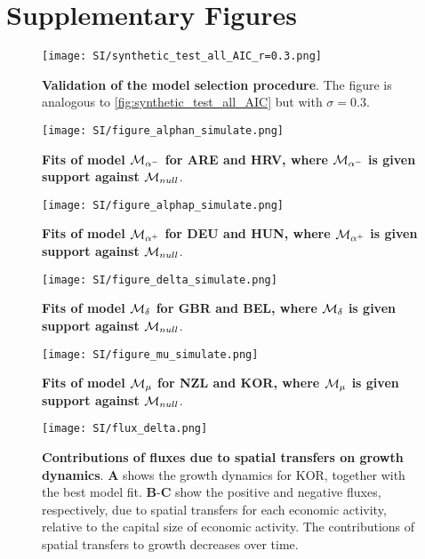 
\graphicspath{{./content/chap4_econobiology/figures/}}

\clearpage
\section{Supplementary Figures}

\begin{figure}[ht]
  \center
  \texttt{[image: SI/synthetic\_test\_all\_AIC\_r=0.3.png]}
  \caption{\small \textbf{Validation of the model selection procedure}. The figure is analogous to \cref{fig:synthetic_test_all_AIC} but with $\sigma = 0.3$. 
   }\label{figSI:synthetic_test_all_AIC}
\end{figure}

\begin{figure}[ht]
  \center
  \texttt{[image: SI/figure\_alphan\_simulate.png]}
  \caption{\small \textbf{Fits of model $\mathcal{M}_{\alpha^-}$ for ARE and HRV, where $\mathcal{M}_{\alpha^-}$ is given support against $\mathcal{M}_{null}$}. 
   }\label{figSI:fit_alphan}
\end{figure}

\begin{figure}[ht]
  \center
  \texttt{[image: SI/figure\_alphap\_simulate.png]}
  \caption{\small \textbf{Fits of model $\mathcal{M}_{\alpha^+}$ for DEU and HUN, where $\mathcal{M}_{\alpha^+}$ is given support against $\mathcal{M}_{null}$}. 
   }\label{figSI:fit_alphap}
\end{figure}

\begin{figure}[ht]
  \center
  \texttt{[image: SI/figure\_delta\_simulate.png]}
  \caption{\small \textbf{Fits of model $\mathcal{M}_\delta$ for GBR and BEL, where $\mathcal{M}_\delta$ is given support against $\mathcal{M}_{null}$}. 
   }\label{figSI:fit_delta}
\end{figure}

\begin{figure}[ht]
  \center
  \texttt{[image: SI/figure\_mu\_simulate.png]}
  \caption{\small \textbf{Fits of model $\mathcal{M}_\mu$ for NZL and KOR, where $\mathcal{M}_\mu$ is given support against $\mathcal{M}_{null}$}. 
   }\label{figSI:fit_mu}
\end{figure}

\begin{figure}[ht]
  \center
  \texttt{[image: SI/flux\_delta.png]}
  \caption{\small \textbf{Contributions of fluxes due to spatial transfers on growth dynamics}. \textbf{A} shows the growth dynamics for KOR, together with the best model fit. \textbf{B}-\textbf{C} show the positive and negative fluxes, respectively, due to spatial transfers for each economic activity, relative to the capital size of economic activity. The contributions of spatial transfers to growth decreases over time.
  }\label{figSI:flux_delta}
\end{figure}

